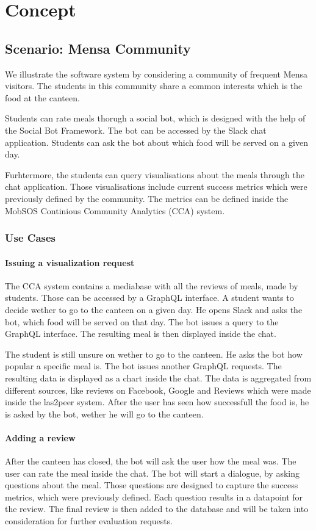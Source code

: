 \chapter{Concept}
\section{Scenario: Mensa Community}
We illustrate the software system by considering a community of frequent Mensa visitors. The students in this community share a common interests which is the food at the canteen.

Students can rate meals thorugh a social bot, which is designed with the help of the Social Bot Framework. The bot can be accessed by the Slack chat application. Students can ask the bot about which food will be served on a given day.

Furhtermore, the students can query visualisations about the meals through the chat application. Those visualisations include current success metrics which were previously defined by the community. The metrics can be defined inside the MobSOS Continious Community Analytics (CCA) system.

\subsection{Use Cases}

\subsubsection{Issuing a visualization request} The CCA system contains a mediabase with all the reviews of meals, made by students. Those can be accessed by a GraphQL interface. A student wants to decide wether to go to the canteen on a given day. He opens Slack and asks the bot, which food will be served on that day. The bot issues a query to the GraphQL interface. The resulting meal is then displayed inside the chat.

The student is still unsure on wether to go to the canteen. He asks the bot how popular a specific meal is. The bot issues another GraphQL requests. The resulting data is displayed as a chart inside the chat. The data is aggregated from different sources, like reviews on Facebook, Google and Reviews which were made inside the las2peer system. After the user has seen how successfull the food is, he is asked by the bot, wether he will go to the canteen.

\subsubsection{Adding a review} After the canteen has closed, the bot will ask the user how the meal was. The user can rate the meal inside the chat. The bot will start a dialogue, by asking questions about the meal. Those questions are designed to capture the success metrics, which were previously defined. Each question results in a datapoint for the review. The final review is then added to the database and will be taken into consideration for further evaluation requests.

